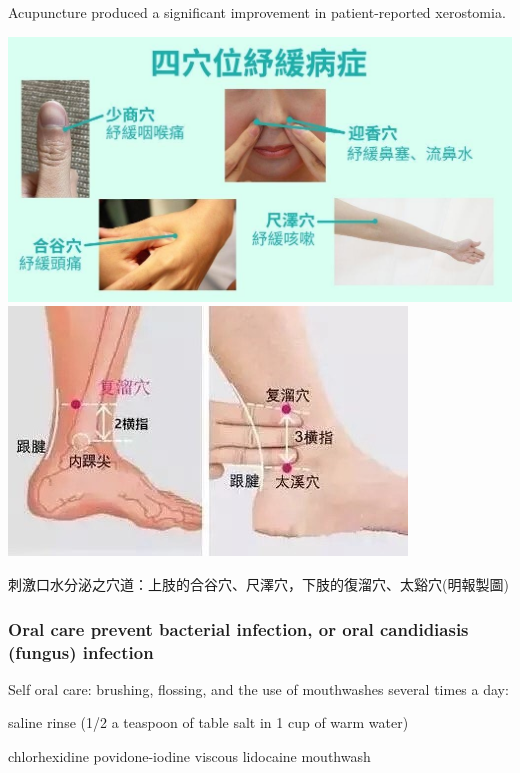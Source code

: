 \documentclass[
paper=landscape,
paper=160mm:90mm, %
fontsize=11pt, %
pagesize, %
parskip=half-, %
]{scrartcl} %
\theoremstyle{mythmstyle} %
\begin{document}
Acupuncture produced a significant improvement in patient-reported xerostomia.\autocite{Ni2020}

\includegraphics[width=0.4\linewidth]{IMG_2364.jpg}
\includegraphics[width=0.4\linewidth]{IMG_2365.jpg}

刺激口水分泌之穴道：上肢的合谷穴、尺澤穴，下肢的復溜穴、太谿穴(明報製圖)


\clearpage

\subsubsection{Oral care prevent bacterial infection, or oral candidiasis (fungus) infection}

Self oral care: brushing, flossing, and the use of mouthwashes several times a day:
\begin{outline}
    \1 saline rinse (1/2 a teaspoon of table salt in 1 cup of warm water)

    \1 chlorhexidine
    \1 povidone-iodine
    \1 viscous lidocaine mouthwash
\end{outline}
\end{document}
